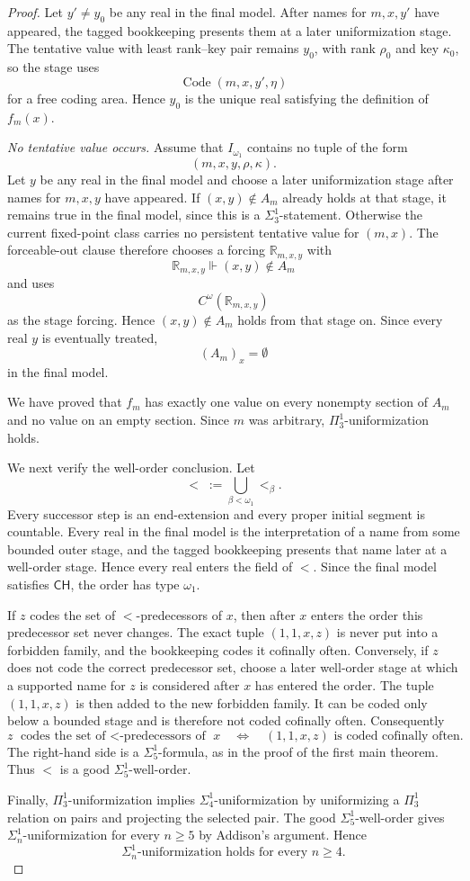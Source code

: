 \documentclass[a4paper,11pt]{article}
\newcommand{\forceR}{\mathbb{R}}
\newcommand{\CH}{\mathsf{CH}}
\begin{document}
\begin{proof}
Let $y'\neq y_0$ be any real in the final model. After names for $m,x,y'$ have appeared, the tagged bookkeeping presents them at a later uniformization stage. The tentative value with least rank--key pair remains $y_0$, with rank $\rho_0$ and key $\kappa_0$, so the stage uses
\[
\operatorname{Code}(m,x,y',\eta)
\]
for a free coding area. Hence $y_0$ is the unique real satisfying the definition of $f_m(x)$.

\medskip
\noindent
\emph{No tentative value occurs.}
Assume that $I_{\omega_1}$ contains no tuple of the form
\[
(m,x,y,\rho,\kappa).
\]
Let $y$ be any real in the final model and choose a later uniformization stage after names for $m,x,y$ have appeared. If $(x,y)\notin A_m$ already holds at that stage, it remains true in the final model, since this is a $\Sigma^1_3$-statement. Otherwise the current fixed-point class carries no persistent tentative value for $(m,x)$. The forceable-out clause therefore chooses a forcing $\forceR_{m,x,y}$ with
\[
\forceR_{m,x,y}\Vdash(x,y)\notin A_m
\]
and uses
\[
C^\omega(\forceR_{m,x,y})
\]
as the stage forcing. Hence $(x,y)\notin A_m$ holds from that stage on. Since every real $y$ is eventually treated,
\[
(A_m)_x=\emptyset
\]
in the final model.

We have proved that $f_m$ has exactly one value on every nonempty section of $A_m$ and no value on an empty section. Since $m$ was arbitrary, $\Pi^1_3$-uniformization holds.

We next verify the well-order conclusion. Let
\[
<\;:=\bigcup_{\beta<\omega_1}<_\beta.
\]
Every successor step is an end-extension and every proper initial segment is countable. Every real in the final model is the interpretation of a name from some bounded outer stage, and the tagged bookkeeping presents that name later at a well-order stage. Hence every real enters the field of $<$. Since the final model satisfies $\CH$, the order has type $\omega_1$.

If $z$ codes the set of $<$-predecessors of $x$, then after $x$ enters the order this predecessor set never changes. The exact tuple $(1,1,x,z)$ is never put into a forbidden family, and the bookkeeping codes it cofinally often. Conversely, if $z$ does not code the correct predecessor set, choose a later well-order stage at which a supported name for $z$ is considered after $x$ has entered the order. The tuple $(1,1,x,z)$ is then added to the new forbidden family. It can be coded only below a bounded stage and is therefore not coded cofinally often. Consequently
\[
z\text{ codes the set of $<$-predecessors of }x
\quad\Longleftrightarrow\quad
(1,1,x,z)\text{ is coded cofinally often}.
\]
The right-hand side is a $\Sigma^1_5$-formula, as in the proof of the first main theorem. Thus $<$ is a good $\Sigma^1_5$-well-order.

Finally, $\Pi^1_3$-uniformization implies $\Sigma^1_4$-uniformization by uniformizing a $\Pi^1_3$ relation on pairs and projecting the selected pair. The good $\Sigma^1_5$-well-order gives $\Sigma^1_n$-uniformization for every $n\geq5$ by Addison's argument. Hence
\[
\Sigma^1_n\text{-uniformization holds for every }n\geq4.
\]
\end{proof}
\end{document}
